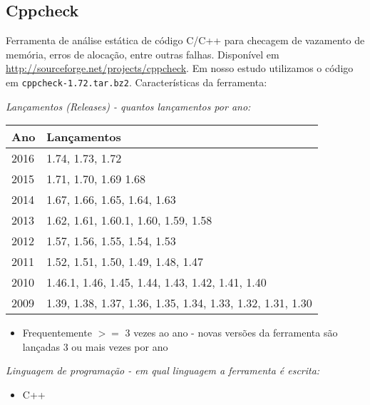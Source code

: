 \subsection{Cppcheck}

Ferramenta de análise estática de código C/C++ para checagem de vazamento de
memória, erros de alocação, entre outras falhas. Disponível em
\url{http://sourceforge.net/projects/cppcheck}. Em nosso estudo utilizamos o
código em \texttt{cppcheck-1.72.tar.bz2}. Características da ferramenta:

\begin{description}

  \item {\it Lançamentos ({\it Releases}) - quantos lançamentos por ano:}
    \begin{table}[h!]
      \centering
      \begin{tabular}{| l | l |}
        \hline
        Ano  & Lançamentos                                                \\
        \hline
        2016 & 1.74, 1.73, 1.72                                           \\
        2015 & 1.71, 1.70, 1.69 1.68                                      \\
        2014 & 1.67, 1.66, 1.65, 1.64, 1.63                               \\
        2013 & 1.62, 1.61, 1.60.1, 1.60, 1.59, 1.58                       \\
        2012 & 1.57, 1.56, 1.55, 1.54, 1.53                               \\
        2011 & 1.52, 1.51, 1.50, 1.49, 1.48, 1.47                         \\
        2010 & 1.46.1, 1.46, 1.45, 1.44, 1.43, 1.42, 1.41, 1.40           \\
        2009 & 1.39, 1.38, 1.37, 1.36, 1.35, 1.34, 1.33, 1.32, 1.31, 1.30 \\
        \hline
      \end{tabular}
    \end{table}
    \begin{itemize}
      \item Frequentemente $>=$ 3 vezes ao ano - novas versões da ferramenta são lançadas 3 ou mais vezes por ano
    \end{itemize}

  \item {\it Linguagem de programação - em qual linguagem a ferramenta é escrita:}
    \begin{itemize}
      \item C++
    \end{itemize}

\end{description}

